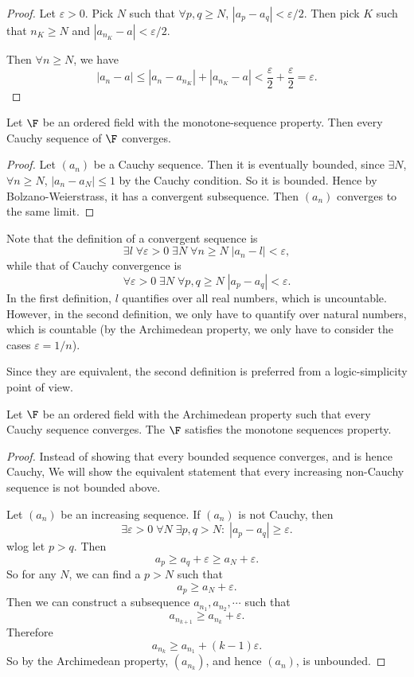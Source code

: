\documentclass[a4paper]{article}
\begin{document}
\begin{proof}
  Let $\varepsilon > 0$. Pick $N$ such that $\forall p, q\geq N$, $|a_p - a_q| < \varepsilon/2$. Then pick $K$ such that $n_K \geq N$ and $|a_{n_K} - a| < \varepsilon/2$.

  Then $\forall n \geq N$, we have
  \[
    |a_n - a| \leq |a_n  - a_{n_K}| + |a_{n_K} - a| < \frac{\varepsilon}{2} + \frac{\varepsilon}{2} = \varepsilon.
  \]
\end{proof}

\begin{thm}
  Let $\F$ be an ordered field with the monotone-sequence property. Then every Cauchy sequence of $\F$ converges.
\end{thm}

\begin{proof}
Let $(a_n)$ be a Cauchy sequence. Then it is eventually bounded, since $\exists N$, $\forall n \geq N$, $|a_n - a_N| \leq 1$ by the Cauchy condition. So it is bounded. Hence by Bolzano-Weierstrass, it has a convergent subsequence. Then $(a_n)$ converges to the same limit.
\end{proof}

Note that the definition of a convergent sequence is
\[
  \exists l\; \forall \varepsilon > 0\; \exists N\; \forall n\geq N\; |a_n - l| < \varepsilon,
\]
while that of Cauchy convergence is
\[
  \forall \varepsilon > 0\; \exists N\; \forall p, q\geq N\; |a_p - a_q| < \varepsilon.
\]
In the first definition, $l$ quantifies over all real numbers, which is uncountable. However, in the second definition, we only have to quantify over natural numbers, which is countable (by the Archimedean property, we only have to consider the cases $\varepsilon = 1/n$).

Since they are equivalent, the second definition is preferred from a logic-simplicity point of view.

\begin{lemma}
  Let $\F$ be an ordered field with the Archimedean property such that every Cauchy sequence converges. The $\F$ satisfies the monotone sequences property.
\end{lemma}

\begin{proof}
  Instead of showing that every bounded sequence converges, and is hence Cauchy, We will show the equivalent statement that every increasing non-Cauchy sequence is not bounded above.

  Let $(a_n)$ be an increasing sequence. If $(a_n)$ is not Cauchy, then
  \[
    \exists \varepsilon > 0\; \forall N\; \exists p, q > N:\; |a_p - a_q| \geq \varepsilon.
  \]
  wlog let $p > q$. Then
  \[
    a_p \geq a_q + \varepsilon \geq a_N + \varepsilon.
  \]
  So for any $N$, we can find a $p > N$ such that
  \[
    a_p \geq a_N + \varepsilon.
  \]
  Then we can construct a subsequence $a_{n_1}, a_{n_2}, \cdots$ such that
  \[
    a_{n_{k + 1}} \geq a_{n_k} + \varepsilon.
  \]
  Therefore
  \[
    a_{n_k} \geq a_{n_1} + (k - 1)\varepsilon.
  \]
  So by the Archimedean property, $(a_{n_k})$, and hence $(a_n)$, is unbounded.
\end{proof}
\end{document}
